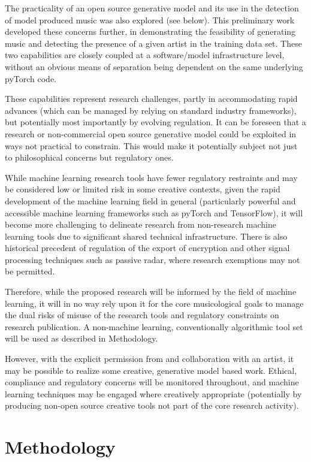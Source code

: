 \documentclass[10pt]{article}
\begin{document}
\begin{multicols*}{2}
The practicality of an open source generative model and its use in the detection of model produced music was also explored (see below). This preliminary work developed these concerns further, in demonstrating the feasibility of generating music and detecting the presence of a given artist in the training data set. These two capabilities are closely coupled at a software/model infrastructure level, without an obvious means of separation being dependent on the same underlying pyTorch code.

These capabilities represent research challenges, partly in accommodating rapid advances (which can be managed by relying on standard industry frameworks), but potentially most importantly by evolving regulation. It can be foreseen that a research or non-commercial open source generative model could be exploited in ways not practical to constrain. This would make it potentially subject not just to philosophical concerns but regulatory ones.

While machine learning research tools have fewer regulatory restraints and may be considered low or limited risk in some creative contexts, given the rapid development of the machine learning field in general (particularly powerful and accessible machine learning frameworks such as pyTorch and TensorFlow), it will become more challenging to delineate research from non-research machine learning tools due to significant shared technical infrastructure. There is also historical precedent of regulation of the export of encryption and other signal processing techniques such as passive radar\cite{munitions}, where research exemptions may not be permitted.

Therefore, while the proposed research will be informed by the field of machine learning, it will in no way rely upon it for the core musicological goals to manage the dual risks of misuse of the research tools and regulatory constraints on research publication. A non-machine learning, conventionally algorithmic tool set will be used as described in Methodology.

However, with the explicit permission from and collaboration with an artist, it may be possible to realize some creative, generative model based work. Ethical, compliance and regulatory concerns will be monitored throughout, and machine learning techniques may be engaged where creatively appropriate (potentially by producing non-open source creative tools not part of the core research activity).

  \section{Methodology}


\end{multicols*}
\end{document}
